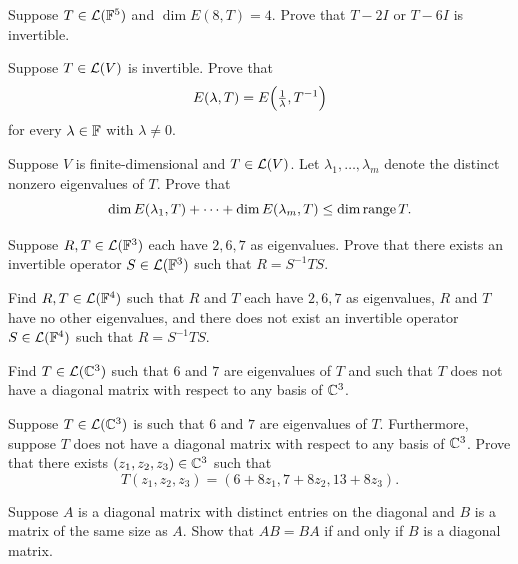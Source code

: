 \begin{exc}
\begin{exercise}
Suppose $T\in\mathcal{L}(\mathbb{F}^5)$ and $\dim E(8,T)=4$. Prove that $T-2I$ or $T-6I$ is
invertible.
\end{exercise}

\begin{exercise}
Suppose $T\in\mathcal{L}(V)$ is invertible. Prove that
\[ E(\lambda,T)=E\Bigl(\tfrac{1}{\lambda},T^{-1}\Bigr) \]
for every $\lambda\in\mathbb{F}$ with $\lambda\ne0$.
\end{exercise}

\begin{exercise}
Suppose $V$ is finite-dimensional and $T\in\mathcal{L}(V)$. Let
$\lambda_1,\dots,\lambda_m$ denote the distinct nonzero eigenvalues of $T$.
Prove that
\[ \operatorname{dim} E(\lambda_1,T)+\cdots+\operatorname{dim} E(\lambda_m,T)\le\operatorname{dim}\operatorname{range} T. \]
\end{exercise}

\begin{exercise}
Suppose $R,T\in\mathcal{L}(\mathbb{F}^3)$ each have $2,6,7$ as eigenvalues. Prove that there
exists an invertible operator $S\in\mathcal{L}(\mathbb{F}^3)$ such that $R=S^{-1}TS$.
\end{exercise}

\begin{exercise}
Find $R,T\in\mathcal{L}(\mathbb{F}^4)$ such that $R$ and $T$ each have $2,6,7$ as eigenvalues,
$R$ and $T$ have no other eigenvalues, and there does not exist an invertible
operator $S\in\mathcal{L}(\mathbb{F}^4)$ such that $R=S^{-1}TS$.
\end{exercise}

\begin{exercise}
Find $T\in\mathcal{L}(\mathbb{C}^3)$ such that $6$ and $7$ are eigenvalues of $T$ and such that
$T$ does not have a diagonal matrix with respect to any basis of $\mathbb{C}^3$.
\end{exercise}

\begin{exercise}
Suppose $T\in\mathcal{L}(\mathbb{C}^3)$ is such that $6$ and $7$ are eigenvalues of $T$.
Furthermore, suppose $T$ does not have a diagonal matrix with respect to any
basis of $\mathbb{C}^3$. Prove that there exists $(z_1,z_2,z_3)\in\mathbb{C}^3$ such that
\[ T(z_1,z_2,z_3)=(6+8z_1,7+8z_2,13+8z_3). \]
\end{exercise}

\begin{exercise}
Suppose $A$ is a diagonal matrix with distinct entries on the diagonal and $B$ is
a matrix of the same size as $A$. Show that $AB=BA$ if and only if $B$ is a
diagonal matrix.
\end{exercise}


\end{exc}
